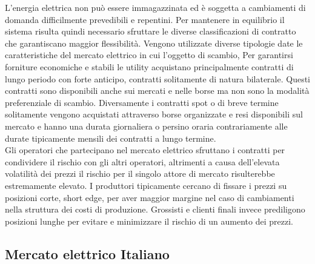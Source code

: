 \documentclass{article}
\begin{document}
L’energia elettrica non può essere immagazzinata ed è soggetta a cambiamenti di domanda difficilmente prevedibili e repentini. Per mantenere in equilibrio il sistema risulta quindi necessario sfruttare le diverse classificazioni di contratto che garantiscano maggior flessibilità. Vengono utilizzate diverse tipologie date le caratteristiche del mercato elettrico in cui l’oggetto di scambio, Per garantirsi forniture economiche e stabili le utility acquistano principalmente contratti di lungo periodo con forte anticipo, contratti solitamente di natura bilaterale. Questi contratti sono disponibili anche sui mercati e nelle borse ma non sono la modalità preferenziale di scambio. Diversamente i contratti spot o di breve termine solitamente vengono acquistati attraverso borse organizzate e resi disponibili sul mercato e hanno una durata giornaliera o persino oraria contrariamente alle durate tipicamente mensili dei contratti a lungo termine.\\
Gli operatori che partecipano nel mercato elettrico sfruttano i contratti per condividere il rischio con gli altri operatori, altrimenti a causa dell’elevata volatilità dei prezzi il rischio per il singolo attore di mercato risulterebbe estremamente elevato. I produttori tipicamente cercano di fissare i prezzi su posizioni corte, short edge, per aver maggior margine nel caso di cambiamenti nella struttura dei costi di produzione. Grossisti e clienti finali invece prediligono posizioni lunghe per evitare e minimizzare il rischio di un aumento dei prezzi.\\
\newpage
\subsection{Mercato elettrico Italiano}
\end{document}
